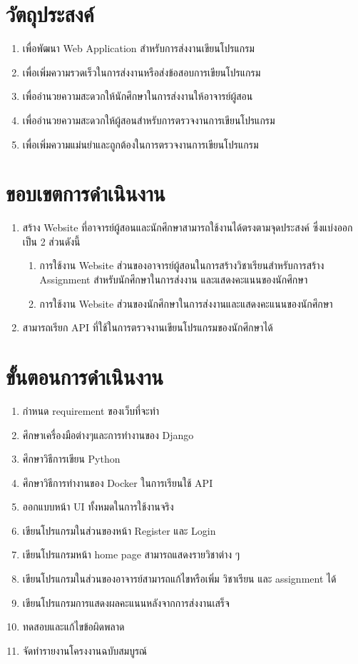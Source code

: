 \section{วัตถุประสงค์}
\begin{enumerate}
    \item เพื่อพัฒนา Web Application สําหรับการส่งงานเขียนโปรแกรม
    \item เพื่อเพิ่มความรวดเร็วในการส่งงานหรือส่งข้อสอบการเขียนโปรแกรม
    \item เพื่ออํานวยความสะดวกให้นักศึกษาในการส่งงานให้อาจารย์ผู้สอน
    \item เพื่ออํานวยความสะดวกให้ผู้สอนสำหรับการตรวจงานการเขียนโปรแกรม
    \item เพื่อเพิ่มความแม่นยำและถูกต้องในการตรวจงานการเขียนโปรแกรม
\end{enumerate}

\section{ขอบเขตการดำเนินงาน}
\begin{enumerate}
    \item สร้าง Website ที่อาจารย์ผู้สอนและนักศึกษาสามารถใช้งานได้ตรงตามจุดประสงค์ ซึ่งแบ่งออกเป็น 2 ส่วนดังนี้
\begin{enumerate}
    \item การใช้งาน Website ส่วนของอาจารย์ผู้สอนในการสร้างวิชาเรียนสำหรับการสร้าง Assignment สำหรับนักศึกษาในการส่งงาน และแสดงคะแนนของนักศึกษา
    \item การใช้งาน Website ส่วนของนักศึกษาในการส่งงานและแสดงคะแนนของนักศึกษา
\end{enumerate}    
    \item สามารถเรียก API ที่ใช้ในการตรวจงานเขียนโปรแกรมของนักศึกษาได้ 
\end{enumerate}
\section{ขั้นตอนการดำเนินงาน}
\begin{enumerate}
    \item กำหนด requirement ของเว็บที่จะทำ
    \item ศึกษาเครื่องมือต่างๆและการทำงานของ Django
    \item ศึกษาวิธีการเขียน Python
    \item ศึกษาวิธีการทำงานของ Docker ในการเรียนใช้ API
    \item ออกแบบหน้า UI ทั้งหมดในการใช้งานจริง
    \item เขียนโปรแกรมในส่วนของหน้า Register และ Login
    \item เขียนโปรแกรมหน้า home page สามารถแสดงรายวิชาต่าง ๆ
    \item เขียนโปรแกรมในส่วนของอาจารย์สามารถแก้ไขหรือเพิ่ม วิชาเรียน และ assignment ได้
    \item เขียนโปรแกรมการแสดงผลคะแนนหลังจากการส่งงานเสร็จ
    \item ทดสอบและแก้ไขข้อผิดพลาด
    \item จัดทำรายงานโครงงานฉบับสมบูรณ์
\end{enumerate}
